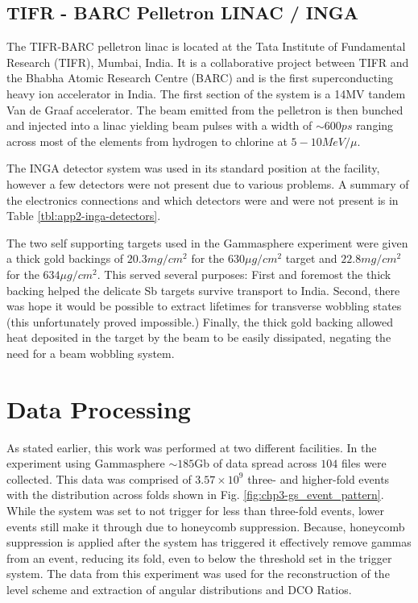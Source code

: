 \subsection{TIFR - BARC Pelletron LINAC / INGA}
\label{ssec:exp-pr-details-inga}
The TIFR-BARC pelletron linac is located at the Tata Institute of Fundamental Research (TIFR), Mumbai, India. It is a collaborative project between TIFR and the Bhabha Atomic Research Centre (BARC) and is the first superconducting heavy ion accelerator in India. The first section of the system is a 14MV tandem Van de Graaf accelerator. The beam emitted from the pelletron is then bunched and injected into a linac yielding beam pulses with a width of $\sim{}600ps$ ranging across most of the elements from hydrogen to chlorine at $5-10MeV/\mu{}$.

The INGA detector system was used in its standard position at the facility, however a few detectors were not present due to various problems. A summary of the electronics connections and which detectors were and were not present is in Table \ref{tbl:app2-inga-detectors}.

The two self supporting targets used in the Gammasphere experiment were given a thick gold backings of $20.3mg/cm^2$ for the $630\mu{}g/cm^2$ target and $22.8mg/cm^2$ for the $634\mu{}g/cm^2$\cite{sbTargets}. This served several purposes: First and foremost the thick backing helped the delicate Sb targets survive transport to India. Second, there was hope it would be possible to extract lifetimes for transverse wobbling states (this unfortunately proved impossible.) Finally, the thick gold backing allowed heat deposited in the target by the beam to be easily dissipated, negating the need for a beam wobbling system.

\section{Data Processing}
\label{sec:exp-pr-data-proc}
 As stated earlier, this work was performed at two different facilities. In the experiment using Gammasphere $\sim{}185$Gb of data spread across $104$ files were collected. This data was comprised of $3.57\times{}10^9$ three- and higher-fold events with the distribution across folds shown in Fig. \ref{fig:chp3-gs_event_pattern}. While the system was set to not trigger for less than three-fold events, lower events still make it through due to honeycomb suppression. Because, honeycomb suppression is applied after the system has triggered it effectively remove gammas from an event, reducing its fold, even to below the threshold set in the trigger system. The data from this experiment was used for the reconstruction of the level scheme and extraction of angular distributions and DCO Ratios.
 

